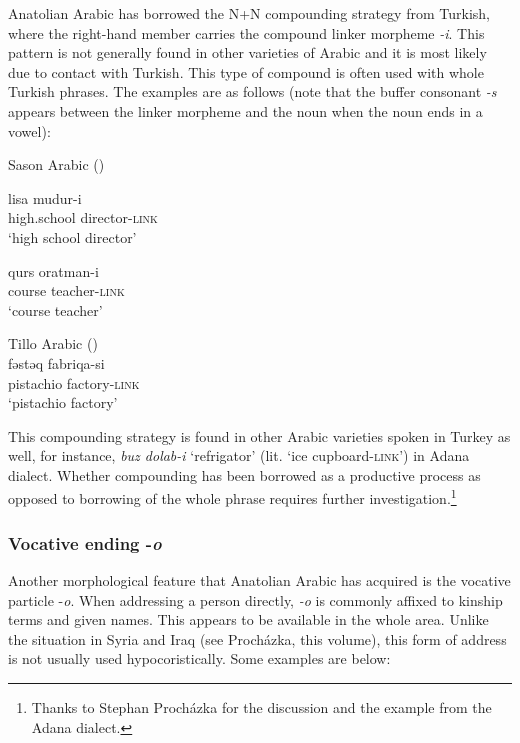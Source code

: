 \documentclass[output=paper]{langsci/langscibook}
\begin{document}
Anatolian Arabic has borrowed the N+N compounding strategy from Turkish, where the right-hand member carries the compound linker morpheme \textit{-i}. This pattern is not generally found in other varieties of Arabic and it is most likely due to contact with Turkish. This type of compound is  often used with whole Turkish phrases. The examples are as follows (note that the buffer consonant \textit{-s} appears between the linker morpheme and the noun when the noun ends in a vowel):

\begin{exe}
\ex \label{coms} Sason Arabic (\citealt[41]{AkkusBenmamoun2018})
		\begin{xlist}
		\ex \label{com1}\gll lisa		mudur-i\\
    high.school director-\textsc{link} \\
        \glt `high school director'


	\ex \label{com2} \gll qurs 	oratman-i  \\
        course	teacher-\textsc{link}\\
        \glt `course teacher'
		\end{xlist}
        
      \ex \label{comt} Tillo Arabic (\citealt[199]{Lahdo2009})\\
      \gll fəstəq fabriqa-si \\
        pistachio factory-\textsc{link}\\
        \glt `pistachio factory' 
\end{exe}

\noindent This compounding strategy is found in other Arabic varieties spoken in Turkey as well, for instance, \textit{buz dolab-i} `refrigator' (lit. `ice cupboard-\textsc{link}') in Adana dialect. Whether compounding has been borrowed as a productive process as opposed to borrowing of the whole phrase requires further investigation.\footnote{Thanks to Stephan Proch\'{a}zka for the discussion and the example from the Adana dialect.}



\subsubsection{Vocative ending -\textit{o}}
Another morphological feature that Anatolian Arabic has acquired is the vocative particle -\textit{o}. When addressing a person directly, \textit{-o} is commonly affixed to kinship terms and given names. This appears to be available in the whole area. Unlike the situation in Syria and Iraq (see Proch\'{a}zka, this volume), this form of address is not usually used hypocoristically. Some examples are below:
\end{document}
